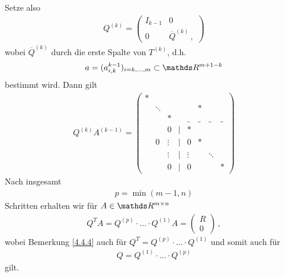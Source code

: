 \begin{Beme}
  Setze also
  \begin{gather}
    Q^{(k)} = \begin{pmatrix}
      I_{k-1} & 0 \\
      0 & \overline{Q}^{(k)} \, ,
      \label{IV.4.13}
    \end{pmatrix}
  \end{gather}
  wobei $\overline{Q}^{(k)} $ durch die erste Spalte von $T^{(k)}$, d.h.
  \begin{gather}
    a= (a_{i,k}^{k-1})_{i=k,\dotsc, m} \subset \R^{m+1-k}
    \label{IV.4.14}
  \end{gather}
  bestimmt wird. Dann gilt
  \begin{gather*}
    Q^{(k)}A^{(k-1)} =
    \begin{pmatrix}
      *  &&&&&\\
      &\ddots &&&& * \\
      &&*&&\_&\_&\_&\_ \\
      &&0&|&* \\
      &0&\vdots&|&0&* \\
      &&\vdots&  |&\vdots &&\ddots\\
      &&0&  |&0&&&*
    \end{pmatrix}
  \end{gather*}
  Nach insgesamt 
  \begin{gather}
    p=\min (m-1, n)
    \label{IV.4.15}
  \end{gather}
  Schritten erhalten wir für $A\in \R^{m\times n}$
  \begin{gather}
    Q^TA = Q^{(p)}\cdot \dotsc \cdot Q^{(1)}A 
    = \begin{pmatrix} R\\0\end{pmatrix}\, ,
  \end{gather}
  wobei Bemerkung \ref{4.4.4} auch für 
  $Q^T= Q^{(p)}\cdot \dotsc \cdot Q^{(1)} $ und somit auch für
  \begin{gather}
    Q = Q^{(1)}\cdot \dotsc \cdot Q^{(p)}
    \label{IV.4.16}
  \end{gather}
  gilt.
\end{Beme}




